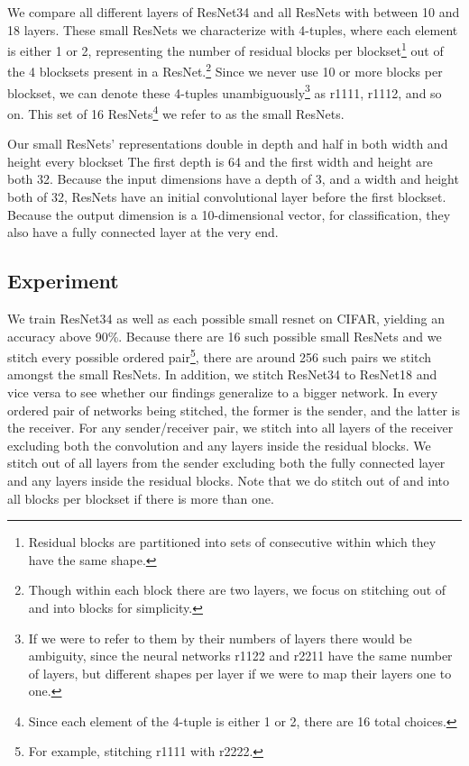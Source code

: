 \documentclass{article} %
\begin{document}
We compare all different
layers of ResNet34 and all
ResNets with between 10 and 18 layers. These small ResNets we characterize with 4-tuples, where 
each element is either 1 or 2, representing the number of residual blocks per blockset\footnote{
   Residual blocks are partitioned into sets of consecutive within which they have the same shape.
} out of the 4 blocksets
present in a ResNet.\footnote{
   Though within each block there are two layers,
   we focus on stitching out of and into blocks for simplicity.
} Since we never use 10 or more blocks per blockset, we can denote these 4-tuples unambiguously\footnote{
   If we were to refer to them by their numbers of layers there would be ambiguity, since the neural networks
   r1122 and r2211 have the same number of layers, but different shapes per layer if we were to map their
   layers one to one.
} as
r1111, r1112, and so on. This set of 16 ResNets\footnote{
   Since each element of the 4-tuple is either 1 or 2, there are 16 total choices.
} we refer to as the small ResNets.

Our small ResNets' representations double in depth and half in both width and height every blockset
The first depth is 64 and the first width and height
are both 32. Because the input dimensions have a depth of 3, and a width and height both of 32, ResNets have an
initial convolutional layer before the first blockset. Because the output dimension is a 10-dimensional vector,
for classification, they also have a fully connected layer at the very end.

\subsection*{Experiment}
We train ResNet34 as well as each possible small resnet on CIFAR, yielding an accuracy above 90\%. Because 
there are 16 such possible
small ResNets and we stitch every possible ordered pair\footnote{
   For example, stitching r1111 with r2222.
}, there are around 256 such pairs we stitch amongst the small
ResNets. In addition, we stitch ResNet34 to ResNet18 and vice versa to see whether our findings generalize to a
bigger network. In every ordered pair of networks being stitched, the former is the sender, and the latter
is the receiver. For any sender/receiver pair, we stitch into all layers of the receiver
excluding both the convolution and any layers inside the residual blocks. We stitch out of all layers from the sender
excluding both the fully connected layer and any layers inside the residual blocks. 
Note that we do stitch out of and into all blocks per blockset if there is more than one.
\end{document}

